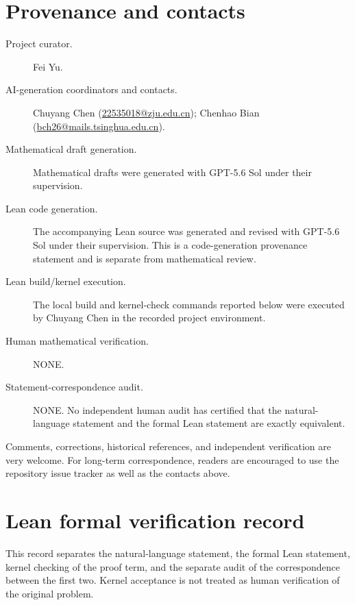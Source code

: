 \documentclass[11pt]{article}
\begin{document}
\section*{Provenance and contacts}
\begingroup\small\sloppy
\begin{description}
\item[Project curator.] Fei Yu.
\item[AI-generation coordinators and contacts.] Chuyang Chen (\href{mailto:22535018@zju.edu.cn}{22535018@zju.edu.cn}); Chenhao Bian (\href{mailto:bch26@mails.tsinghua.edu.cn}{bch26@mails.tsinghua.edu.cn}).
\item[Mathematical draft generation.] Mathematical drafts were generated with GPT-5.6 Sol under their supervision.
\item[Lean code generation.] The accompanying Lean source was generated and revised with GPT-5.6 Sol under their supervision. This is a code-generation provenance statement and is separate from mathematical review.
\item[Lean build/kernel execution.] The local build and kernel-check commands reported below were executed by Chuyang Chen in the recorded project environment.
\item[Human mathematical verification.] NONE.
\item[Statement-correspondence audit.] NONE. No independent human audit has certified that the natural-language statement and the formal Lean statement are exactly equivalent.
\end{description}
\medskip
\noindent Comments, corrections, historical references, and independent verification are very welcome. For long-term correspondence, readers are encouraged to use the repository issue tracker as well as the contacts above.
\endgroup

\section*{Lean formal verification record}

\begingroup\small\sloppy
This record separates the natural-language statement, the formal Lean statement, kernel checking of the proof term, and the separate audit of the correspondence between the first two. Kernel acceptance is not treated as human verification of the original problem.
\end{document}
